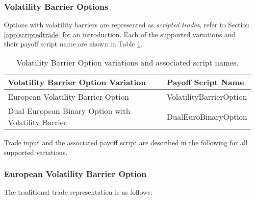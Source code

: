 \subsubsection{Volatility Barrier Options}
\label{SubSectionVolatilityBarrier}

Options with volatility barriers are represented as {\em scripted trades}, refer to Section
\ref{app:scriptedtrade} for an introduction. Each of the supported variations and their payoff script
name are shown in Table \ref{tab:barrier_options}.

\begin{table}[hbt]
\begin{center}
\begin{tabular}{|l|l|}
\hline
Volatility Barrier Option Variation & Payoff Script Name \\
\hline
\hline
European Volatility Barrier Option & VolatilityBarrierOption \\
\hline
Dual European Binary Option with Volatility Barrier & DualEuroBinaryOption \\
\hline
\end{tabular}
\end{center}
\caption{Volatility Barrier Option variations and associated script names.}
\label{tab:barrier_options}
\end{table}

Trade input and the associated payoff script are described in the following for all supported variations.

\subsubsection*{European Volatility Barrier Option}

The traditional trade representation is as follows:

